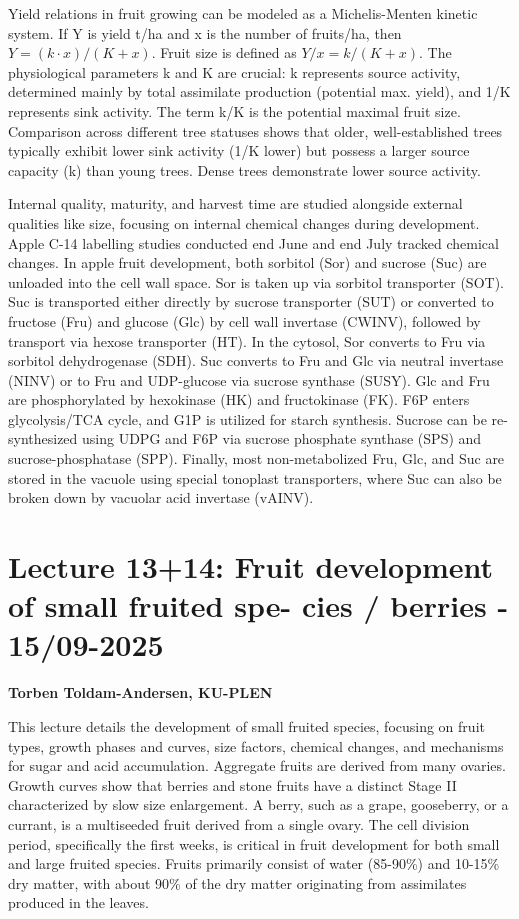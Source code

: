 \vspace{0.5em}
Yield relations in fruit growing can be modeled as a Michelis-Menten kinetic system. If Y is yield t/ha and x is the number of fruits/ha, then $Y=(k \cdot x)/(K+x)$. Fruit size is defined as $Y/x=k/(K+x)$. The physiological parameters k and K are crucial: k represents source activity, determined mainly by total assimilate production (potential max. yield), and 1/K represents sink activity. The term k/K is the potential maximal fruit size. Comparison across different tree statuses shows that older, well-established trees typically exhibit lower sink activity (1/K lower) but possess a larger source capacity (k) than young trees. Dense trees demonstrate lower source activity.

\vspace{0.5em}
Internal quality, maturity, and harvest time are studied alongside external qualities like size, focusing on internal chemical changes during development. Apple C-14 labelling studies conducted end June and end July tracked chemical changes. In apple fruit development, both sorbitol (Sor) and sucrose (Suc) are unloaded into the cell wall space. Sor is taken up via sorbitol transporter (SOT). Suc is transported either directly by sucrose transporter (SUT) or converted to fructose (Fru) and glucose (Glc) by cell wall invertase (CWINV), followed by transport via hexose transporter (HT). In the cytosol, Sor converts to Fru via sorbitol dehydrogenase (SDH). Suc converts to Fru and Glc via neutral invertase (NINV) or to Fru and UDP-glucose via sucrose synthase (SUSY). Glc and Fru are phosphorylated by hexokinase (HK) and fructokinase (FK). F6P enters glycolysis/TCA cycle, and G1P is utilized for starch synthesis. Sucrose can be re-synthesized using UDPG and F6P via sucrose phosphate synthase (SPS) and sucrose-phosphatase (SPP). Finally, most non-metabolized Fru, Glc, and Suc are stored in the vacuole using special tonoplast transporters, where Suc can also be broken down by vacuolar acid invertase (vAINV).


\section{Lecture 13+14: Fruit development of small fruited spe- cies / berries - 15/09-2025} 
\textbf{Torben Toldam-Andersen, KU-PLEN}

\vspace{1em}
This lecture details the development of small fruited species, focusing on fruit types, growth phases and curves, size factors, chemical changes, and mechanisms for sugar and acid accumulation. Aggregate fruits are derived from many ovaries. Growth curves show that berries and stone fruits have a distinct Stage II characterized by slow size enlargement. A berry, such as a grape, gooseberry, or a currant, is a multiseeded fruit derived from a single ovary. The cell division period, specifically the first weeks, is critical in fruit development for both small and large fruited species. Fruits primarily consist of water (85-90\%) and 10-15\% dry matter, with about 90\% of the dry matter originating from assimilates produced in the leaves.

